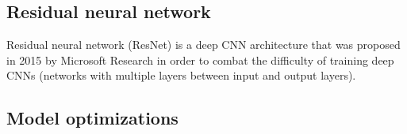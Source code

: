 
\lipsum[2]

\subsection{Residual neural network}

Residual neural network (ResNet) is a deep CNN architecture that was proposed in 2015 by Microsoft Research in order to combat the difficulty of training deep CNNs (networks with multiple layers between input and output layers).


\lipsum[3]

\subsection{Model optimizations}
\lipsum[4]